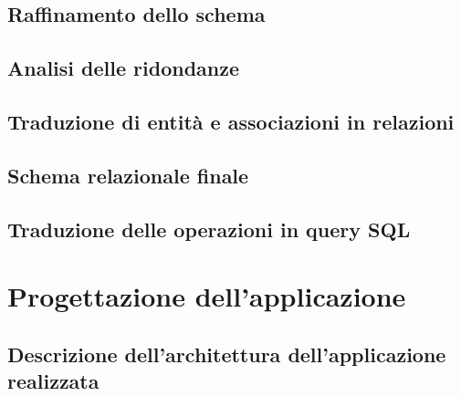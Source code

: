\documentclass[a4paper, 12pt]{report}
\begin{document}
\section{Raffinamento dello schema}

\section{Analisi delle ridondanze}

\section{Traduzione di entità e associazioni in relazioni}

\section{Schema relazionale finale}

\section{Traduzione delle operazioni in query SQL}

\chapter{Progettazione dell’applicazione}

\section{Descrizione dell’architettura dell’applicazione realizzata}
\end{document}

